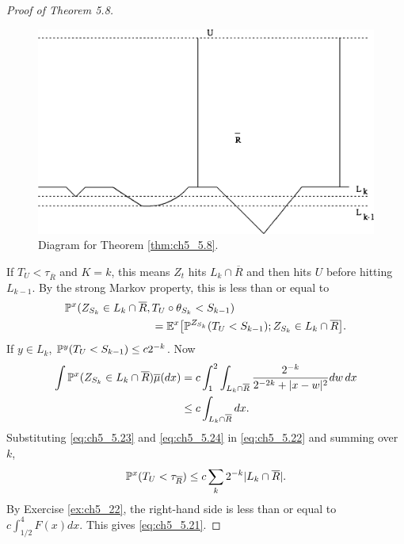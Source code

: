 \begin{proof}[Proof of Theorem 5.8]
\begin{figure}[ht]
    \centering\includegraphics{Images/Img12.png}
    \bigskip
    \caption{Diagram for Theorem \ref{thm:ch5_5.8}.}
    \label{fig:ch5_5.1}
\end{figure}

If $T_U < \tau_{\overline{R}}$ and $K = k$, this means $Z_t$ hits $L_k \cap \overline{R}$ and then hits $U$ before hitting $L_{k-1}$. By the strong Markov property, this is less than or equal to
\begin{align}\label{eq:ch5_5.23}
    \P^x(Z_{S_k} \in L_k \cap \overline{R},\,&T_U \circ \theta_{S_k} < S_{k-1}) \\
    &= \E^x\big[\P^{Z_{S_k}}(T_U < S_{k-1}); Z_{S_k} \in L_k \cap \overline{R}\big]. \notag
\end{align}
If $y \in L_k$, $\P^y(T_U < S_{k-1}) \leq c2^{-k}$. Now
\mpagebreak
\begin{align}\label{eq:ch5_5.24}
    \int \P^x(Z_{S_k} \in L_k \cap \overline{R})\overline{\mu}(dx) &= c \int_1^2 \int_{L_k \cap \overline{R}} \frac{2^{-k}}{2^{-2k} + |x - w|^2}dw\, dx \\
    &\leq c\int_{L_k \cap \overline{R}} dx. \notag
\end{align}
Substituting \eqref{eq:ch5_5.23} and \eqref{eq:ch5_5.24} in \eqref{eq:ch5_5.22} and summing over $k$,
\begin{equation}\label{eq:ch5_5.25}
    \P^x(T_U < \tau_{\overline{R}}) \leq c\sum_{k} 2^{-k}|L_k \cap \overline{R}|.
\end{equation}
By Exercise \ref{ex:ch5_22}, the right-hand side is less than or equal to $c\int_{1/2}^4 F(x)dx$. This gives \eqref{eq:ch5_5.21}.
\end{proof}


